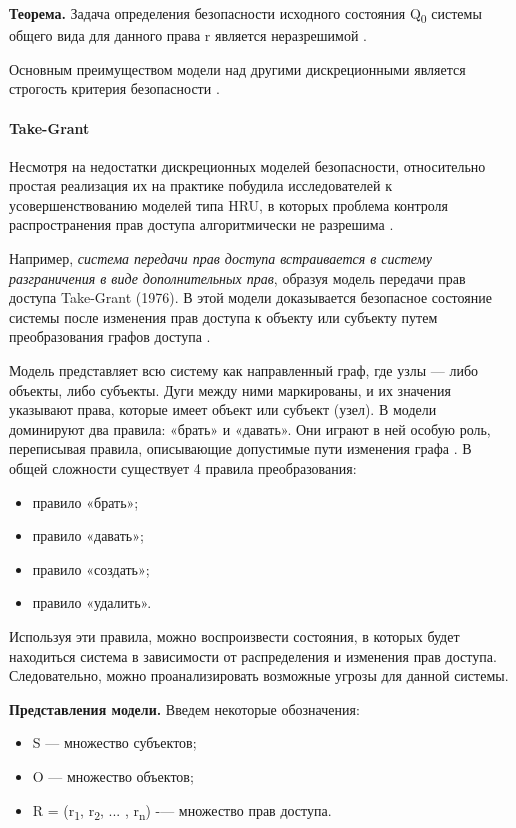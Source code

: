 \textbf{Теорема.} Задача определения безопасности исходного состояния Q\textsubscript{0} системы общего вида для
данного права r является неразрешимой \autocite{WikiHRU}.

Основным преимуществом модели над другими дискреционными является строгость критерия безопасности \autocite{WikiHRU}.

\paragraph{Take-Grant}

Несмотря на недостатки дискреционных моделей безопасности, относительно простая реализация их на практике побудила
исследователей к усовершенствованию моделей типа HRU, в которых проблема контроля распространения прав доступа
алгоритмически не разрешима \autocite{URFULecture10Models}.

Например, \textit{система передачи прав доступа встраивается в систему разграничения в виде дополнительных прав}, образуя
модель передачи прав доступа Take-Grant (1976). В этой модели доказывается безопасное состояние системы после
изменения прав доступа к объекту или субъекту путем преобразования графов доступа \autocite{URFULecture10Models}.

Модель представляет всю систему как направленный граф, где узлы — либо объекты, либо субъекты. Дуги между ними
маркированы, и их значения указывают права, которые имеет объект или субъект (узел). В модели доминируют два правила:
«брать» и «давать». Они играют в ней особую роль, переписывая правила, описывающие допустимые пути изменения графа \autocite{WikiTakeGrant}.
В общей сложности существует 4 правила преобразования:
\begin{itemize}
    \item правило «брать»;
    \item правило «давать»;
    \item правило «создать»;
    \item правило «удалить».
\end{itemize}
Используя эти правила, можно воспроизвести состояния, в которых будет находиться система в зависимости от распределения
и изменения прав доступа. Следовательно, можно проанализировать возможные угрозы для данной системы.

\textbf{Представления модели.} Введем некоторые обозначения:
\begin{itemize}
    \item S — множество субъектов;
    \item O — множество объектов;
    \item R = (r\textsubscript{1}, r\textsubscript{2}, ... , r\textsubscript{n}) -— множество прав доступа.
\end{itemize}

